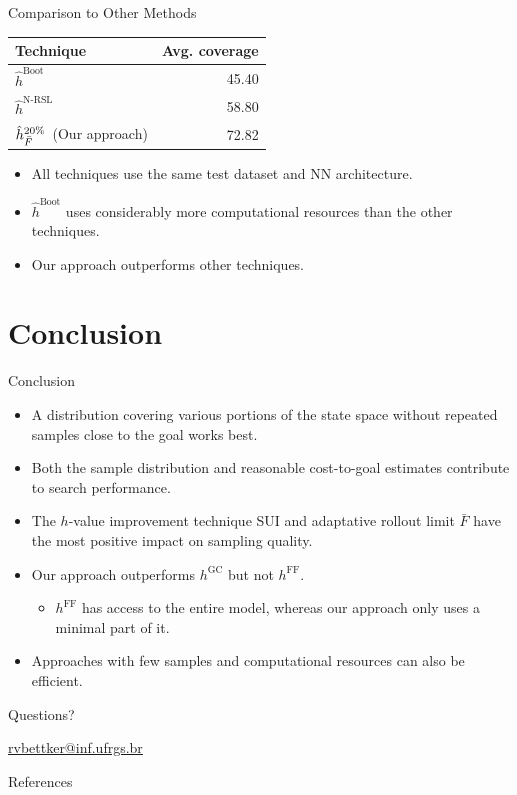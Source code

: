 \documentclass[10pt]{beamer}
\newcommand{\email}[1]{\href{mailto:#1}{#1}}
\providecommand{\meanfx}{\ensuremath{\bar F}\xspace}
\providecommand{\h}{\ensuremath{h}\xspace}
\providecommand{\hvalue}[1]{\ensuremath{h^{#1}}\xspace}
\providecommand{\hff}{\hvalue{\text{FF}}}
\providecommand{\hgc}{\hvalue{\text{GC}}}
\providecommand{\hnnrsp}[1]{\ensuremath{\hat h{^{#1\%}_\text{\meanfx}}}\xspace}
\providecommand{\hnnrs}{\hnnrsp{20}}
\providecommand{\hnrsl}{\ensuremath{\hat h^{\text{N-RSL}}}\xspace}
\providecommand{\hboot}{\ensuremath{\hat h^{\text{Boot}}}\xspace}
\begin{document}
\begin{frame}{Comparison to Other Methods} %
\begin{table}[]
\begin{tabular}{l|r}
    Technique & Avg. coverage \\
    \hline
    \hboot~\citep{ferber2022neural} & 45.40 \\
    \hnrsl~\citep{otoole2022sampling} & 58.80 \\
    \hnnrs~(Our approach) & 72.82 \\
\end{tabular}
\end{table}
\bigskip
\begin{itemize}
    \item All techniques use the same test dataset and NN architecture.
    \item \hboot uses considerably more computational resources than the other techniques.
    \item Our approach outperforms other techniques.
\end{itemize}
\end{frame}

\section{Conclusion}

\begin{frame}{Conclusion}
\begin{itemize}
    \item A distribution covering various portions of the state space without repeated samples close to the goal works best.
    \item Both the sample distribution and reasonable cost-to-goal estimates contribute to search performance.
    \item The \h-value improvement technique SUI and adaptative rollout limit \meanfx have the most positive impact on sampling quality.
    \item Our approach outperforms \hgc but not \hff.
    \begin{itemize}
        \item \hff has access to the entire model, whereas our approach only uses a minimal part of it.
    \end{itemize}
    \item Approaches with few samples and computational resources can also be efficient.
\end{itemize}
\end{frame}

{
\begin{frame}[standout]
  Questions?

  \small \email{rvbettker@inf.ufrgs.br}
\end{frame}
}

\begin{frame}[allowframebreaks]{References}
  
  
\end{frame}
\end{document}
